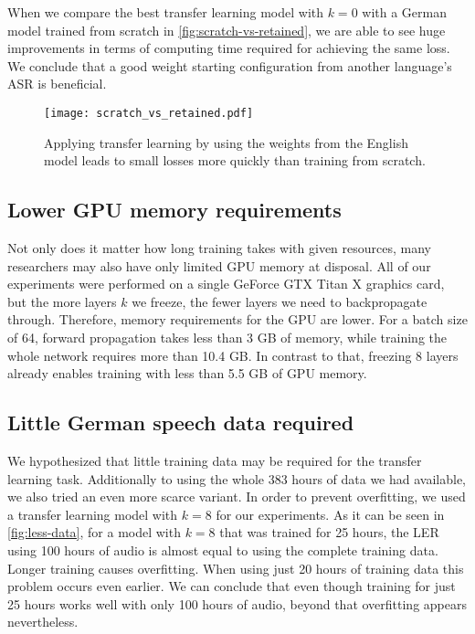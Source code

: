 \documentclass[11pt,a4paper]{article}
\begin{document}
When we compare the best transfer learning model with $k = 0$ with a German model trained from scratch in \autoref{fig:scratch-vs-retained},
we are able to see huge improvements in terms of computing time required for achieving the same loss.
We conclude that a good weight starting configuration from another language's \ac{ASR} is beneficial.

\begin{figure}[th]
  \texttt{[image: scratch\_vs\_retained.pdf]}
  \caption{Applying transfer learning by using the weights from the English model leads to small losses more quickly than training from scratch.}
  \label{fig:scratch-vs-retained}
\end{figure}

\subsection{Lower GPU memory requirements}

Not only does it matter how long training takes with given resources,
many researchers may also have only limited GPU memory at disposal.
All of our experiments were performed on a single GeForce GTX Titan X graphics card,
but the more layers $k$ we freeze, the fewer layers we need to backpropagate through.
Therefore, memory requirements for the GPU are lower.
For a batch size of 64, forward propagation takes less than 3 GB of memory,
while training the whole network requires more than 10.4 GB.
In contrast to that, freezing 8 layers already enables training with less than 5.5 GB of GPU memory.

\subsection{Little German speech data required}

We hypothesized that little training data may be required for the transfer learning task.
Additionally to using the whole 383 hours of data we had available, we also tried an even more scarce variant.
In order to prevent overfitting, we used a transfer learning model with $k = 8$ for our experiments.
As it can be seen in \autoref{fig:less-data}, for a model with $k = 8$ that was trained for 25 hours, the \ac{LER} using 100 hours of audio is almost equal to using the complete training data.
Longer training causes overfitting.
When using just 20 hours of training data this problem occurs even earlier.
We can conclude that even though training for just 25 hours works well with only 100 hours of audio, beyond that overfitting appears nevertheless.
\end{document}
